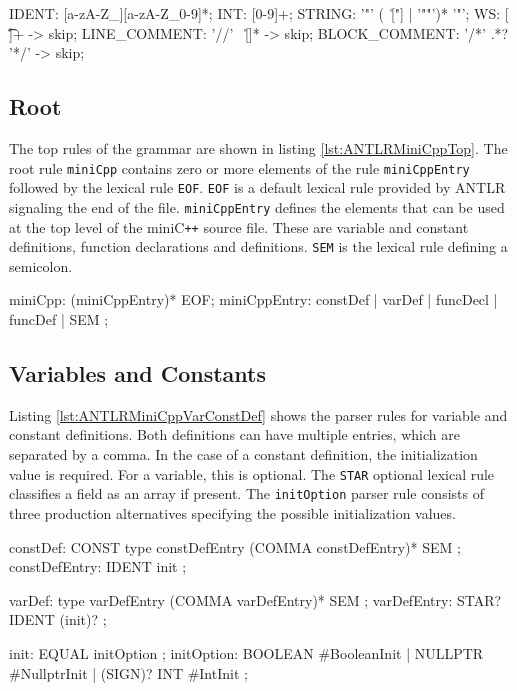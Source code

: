 \begin{AntlrCode}[float,numbers=none,caption=Terminal classes of the MiniC++ ANTLR grammar., label=lst:ANTLRMiniCppTermClass]
IDENT:          [a-zA-Z_][a-zA-Z_0-9]*;
INT:            [0-9]+;
STRING:         '"' (~[\r\n"] | '""')* '"';
WS:             [ \t\n\r]+ -> skip;
LINE_COMMENT:   '//' ~[\r\n]* -> skip;
BLOCK_COMMENT:  '/*' .*? '*/' -> skip;
\end{AntlrCode}


\subsection{Root}

The top rules of the grammar are shown in listing \ref{lst:ANTLRMiniCppTop}. The root rule \texttt{miniCpp} contains zero or more elements of the rule \texttt{miniCppEntry} followed by the lexical rule \texttt{EOF}. \texttt{EOF} is a default lexical rule provided by ANTLR signaling the end of the file. \texttt{miniCppEntry} defines the elements that can be used at the top level of the miniC\verb|++| source file. These are variable and constant definitions, function declarations and definitions. \texttt{SEM} is the lexical rule defining a semicolon. 

\begin{AntlrCode}[float,numbers=none,caption=Top rules of the MiniC++ ANTLR grammar., label=lst:ANTLRMiniCppTop]
miniCpp:     (miniCppEntry)* EOF;
miniCppEntry:     constDef
                | varDef
                | funcDecl
                | funcDef
                | SEM
                ;
\end{AntlrCode}



\subsection{Variables and Constants}

Listing \ref{lst:ANTLRMiniCppVarConstDef} shows the parser rules for variable and constant definitions. Both definitions can have multiple entries, which are separated by a comma. In the case of a constant definition, the initialization value is required. For a variable, this is optional. The \texttt{STAR} optional lexical rule classifies a field as an array if present. The \texttt{initOption} parser rule consists of three production alternatives specifying the possible initialization values. 

\begin{AntlrCode}[float,numbers=none,caption=Variable and constant defintions of the MiniC++ ANTLR grammar., label=lst:ANTLRMiniCppVarConstDef]
constDef:        CONST type constDefEntry (COMMA constDefEntry)* SEM ;
constDefEntry:   IDENT init ;

varDef:          type varDefEntry (COMMA varDefEntry)* SEM ;
varDefEntry:     STAR? IDENT (init)? ;

init:            EQUAL  initOption ;
initOption:      BOOLEAN      #BooleanInit
               | NULLPTR      #NullptrInit
               | (SIGN)? INT  #IntInit
               ;
\end{AntlrCode}

